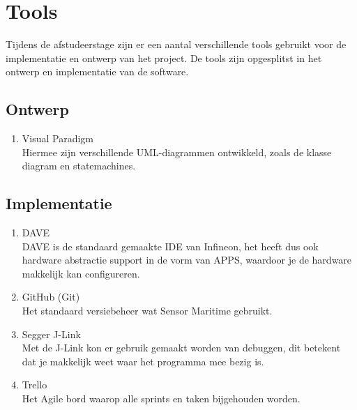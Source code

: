 \section{Tools}
Tijdens de afstudeerstage zijn er een aantal verschillende tools gebruikt voor de implementatie en ontwerp van het project. De tools zijn opgesplitst in het ontwerp en implementatie van de software.

\subsection{Ontwerp}
\begin{enumerate}
	\item Visual Paradigm \\ Hiermee zijn verschillende UML-diagrammen ontwikkeld, zoals de klasse diagram en statemachines.
\end{enumerate}
\subsection{Implementatie}
\begin{enumerate}
	\item DAVE \\ DAVE is de standaard gemaakte IDE van Infineon, het heeft dus ook hardware abstractie support in de vorm van APPS, waardoor je de hardware makkelijk kan configureren.
	\item GitHub (Git) \\ Het standaard versiebeheer wat Sensor Maritime gebruikt.
	\item Segger J-Link \\ Met de J-Link kon er gebruik gemaakt worden van debuggen, dit betekent dat je makkelijk weet waar het programma mee bezig is.
	\item Trello \\ Het Agile bord waarop alle sprints en taken bijgehouden worden.
\end{enumerate}

